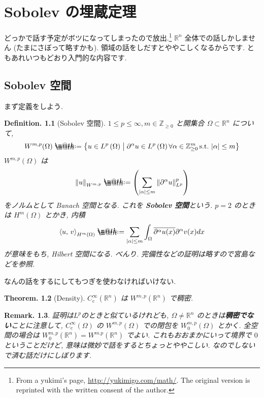 \documentclass[openany, a4paper, oneside]{jsbook}
\makeatletter
\newcommand*{\defeq}{\mathrel{\rlap{%
\raisebox{0.3ex}{$\m@th\cdot$}}%
\raisebox{-0.3ex}{$\m@th\cdot$}}%
=}
\theoremstyle{break}
\theoremstyle{breakdefn}
\newtheorem{thm}{Theorem.}[section]
\newtheorem{defn}[thm]{Definition.}
\newtheorem{rem}[thm]{Remark.}
\newcommand{\abs}[1]{\left|#1\right|}
\newcommand{\norm}[1]{\left\Vert#1\right\Vert}
\newcommand{\rbk}[1]{\left (#1\right)}
\newcommand{\bkt}[2]{\left\langle#1,\,#2\right\rangle}
\newcommand{\relmiddle}[1]{\mathrel{}\middle#1\mathrel{}}
\newcommand{\set}[2]{\left\{#1 \relmiddle| #2\right\}}
\newcommand{\bbR}{\mathbb{R}}
\newcommand{\bbRn}{\mathbb{R}^n}
\newcommand{\bbZ}{\mathbb{Z}}
\newcommand{\Ccinfty}{C_{\mathrm{c}}^{\infty}}
\makeatother
\begin{document}
\chapter{Sobolev の埋蔵定理}


どっかで話す予定がボツになってしまったので放出.\footnote{From a yukimi's page, \href{http://yukimigo.com/math/}{http://yukimigo.com/math/}.
The original version is reprinted with the written consent of the author.
 }
$\mathbb{R}^n$ 全体での話しかしません (たまにさぼって略すかも).
領域の話をしだすとややこしくなるからです.
ともあれいつもどおり入門的な内容です.
\section{Sobolev 空間}


まず定義をしよう.
\begin{defn}[Sobolev 空間]
 $1 \le p \le \infty, m \in \bbZ_{\ge 0}$
 と開集合 $\Omega \subset \bbRn$ について,
 \begin{align}
  W^{m, p}(\Omega)
  \defeq
  \set{u \in L^p \rbk{\Omega}}{\partial^{\alpha} u \in L^p \rbk{\Omega} \forall \alpha \in \bbZ_{\geq 0}^{m}\, \text{s.t.} \, \abs{\alpha} \le m }
 \end{align}
 $W^{m, p}(\Omega)$ は
 \begin{align}
  \norm{u}_{W^{m,p}}
  \defeq
  \rbk{\sum_{\abs{\alpha} \le m} \norm{\partial^{\alpha} u}_{L^p}^p}
 \end{align}
 をノルムとして Banach 空間となる.
 これを \textbf{Sobolev 空間}という.
 $p = 2$ のときは $H^m (\Omega)$ とかき, 内積
 \begin{align}
  \bkt{u}{v}_{H^m \rbk{\Omega}}
  \defeq
  \sum_{\abs{\alpha} \leq m}
  \int_{\Omega} \overline{\partial^{\alpha}u (x)} \partial^{\alpha}v (x) dx
 \end{align}
 が意味をもち, Hilbert 空間になる.
 べんり.
 完備性などの証明は略すので宮島\cite{ShizuoMiyajima1}などを参照.
\end{defn}
なんの話をするにしてもつぎを使わなければいけない.
\begin{thm}[Density]
 $\Ccinfty(\bbRn)$ は $W^{m, p}(\bbR^n)$ で稠密.
\end{thm}
\begin{rem}
 証明は$L^p$のときと似ているけれども, $\Omega \neq \bbR^n$ のときは\textbf{稠密でない}ことに注意して,
 $\Ccinfty (\Omega)$ の $W^{m, p}(\Omega)$ での閉包を $W_0^{m, p}(\Omega)$ とかく.
 全空間の場合は $W_0^{m, p}(\mathbb{R}^n) = W^{m. p}(\mathbb{R}^n)$ でよい.
 これもおおまかにいって境界で $0$ ということだけど, 意味は微妙で話をするとちょっとややこしい.
 なのでしないで済む話だけにしぼります.
\end{rem}
\end{document}
